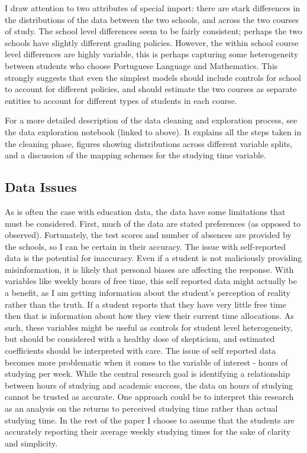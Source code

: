 \documentclass[12pt]{article}
\begin{document}
I draw attention to two attributes of special import: there are stark differences in the distributions of the data between the two schools, and across the two courses of study. The school level differences seem to be fairly consistent; perhaps the two schools have slightly different grading policies. However, the within school course level differences are highly variable, this is perhaps capturing some heterogeneity between students who choose Portuguese Language and Mathematics. This strongly suggests that even the simplest models should include controls for school to account for different policies, and should estimate the two courses as separate entities to account for different types of students in each course.

For a more detailed description of the data cleaning and exploration process, see the data exploration notebook (linked to above). It explains all the steps taken in the cleaning phase, figures showing distributions across different variable splits, and a discussion of the mapping schemes for the studying time variable.


\subsection{Data Issues} \label{data_issues}
As is often the case with education data, the data have some limitations that must be considered. First, much of the data are stated preferences (as opposed to observed). Fortunately, the test scores and number of absences are provided by the schools, so I can be certain in their accuracy. The issue with self-reported data is the potential for inaccuracy. Even if a student is not maliciously providing misinformation, it is likely that personal biases are affecting the response. With variables like weekly hours of free time, this self reported data might actually be a benefit, as I am getting information about the student's perception of reality rather than the truth. If a student reports that they have very little free time then that is information about how they view their current time allocations. As such, these variables might be useful as controls for student level heterogeneity, but should be considered with a healthy dose of skepticism, and estimated coefficients should be interpreted with care. The issue of self reported data becomes more problematic when it comes to the variable of interest - hours of studying per week. While the central research goal is identifying a relationship between hours of studying and academic success, the data on hours of studying cannot be trusted as accurate. One approach could be to interpret this research as an analysis on the returns to perceived studying time rather than actual studying time. In the rest of the paper I choose to assume that the students are accurately reporting their average weekly studying times for the sake of clarity and simplicity.
\end{document}
